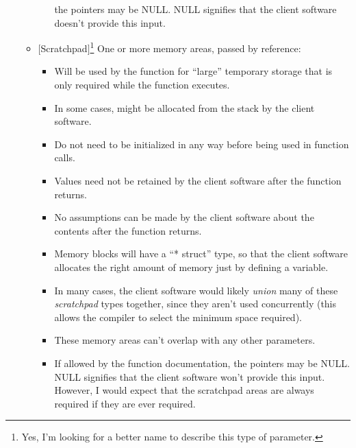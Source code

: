 \begin{itemize}
\begin{itemize}
\begin{itemize}
                  the
                  pointers may be NULL\@.  NULL signifies
                  that the client
                  software doesn't provide this input.
            \end{itemize}
      \item $[$Scratchpad$]$\footnote{Yes, I'm looking for
            a better name to describe this
            type of parameter.}  One or more memory areas,
            passed by reference:
            \begin{itemize}
            \item Will be used by the
                  \emph{\productbasenameshort{}} function 
                  for
                  ``large'' temporary storage that is only
                  required while the
                  function executes.
            \item In some cases, might be allocated from
                  the stack by the client software.
            \item Do not need to be initialized in any way
                  before being used in
                  \emph{\productbasenameshort{}} function
                  calls.
            \item Values need not be retained by the client
                  software after the 
                  \emph{\productbasenameshort{}} function
                  returns.
            \item No assumptions can be made by the client
                  software about the contents
                  after the \emph{\productbasenameshort{}}
                  function returns.
            \item Memory blocks will have a ``* struct''
                  type, so that the client software
                  allocates the right amount of memory
                  just by defining a variable.
            \item In many cases, the client software would
                  likely \emph{union} many of these
                  \emph{scratchpad} types together, since
                  they aren't used concurrently (this
                  allows the compiler to select the minimum
                  space required).
            \item These memory areas can't overlap with any
                  other parameters.
            \item If allowed by the function documentation,
                  the
                  pointers may be NULL\@.  NULL signifies 
                  that the client
                  software won't provide this input.
                  However, I would expect that
                  the scratchpad areas are always required
                  if they are ever required.
            \end{itemize}
      \end{itemize}
\end{itemize}

